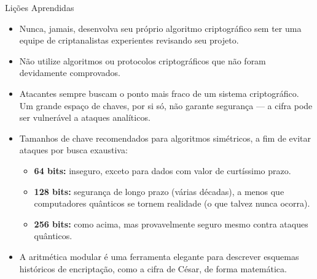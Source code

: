 \documentclass{beamer}
\begin{document}
\begin{frame}{Lições Aprendidas}
\vspace{-0.5em}
\begin{itemize}
    \item Nunca, jamais, desenvolva seu próprio algoritmo criptográfico sem ter uma equipe de criptanalistas experientes revisando seu projeto.

    \item Não utilize algoritmos ou protocolos criptográficos que não foram devidamente comprovados.

    \item Atacantes sempre buscam o ponto mais fraco de um sistema criptográfico. Um grande espaço de chaves, por si só, não garante segurança — a cifra pode ser vulnerável a ataques analíticos.

    \item Tamanhos de chave recomendados para algoritmos simétricos, a fim de evitar ataques por busca exaustiva:
    \begin{itemize}
        \item \textbf{64 bits:} inseguro, exceto para dados com valor de curtíssimo prazo.
        \item \textbf{128 bits:} segurança de longo prazo (várias décadas), a menos que computadores quânticos se tornem realidade (o que talvez nunca ocorra).
        \item \textbf{256 bits:} como acima, mas provavelmente seguro mesmo contra ataques quânticos.
    \end{itemize}

    \item A aritmética modular é uma ferramenta elegante para descrever esquemas históricos de encriptação, como a cifra de César, de forma matemática.
\end{itemize}
\end{frame}
\end{document}
